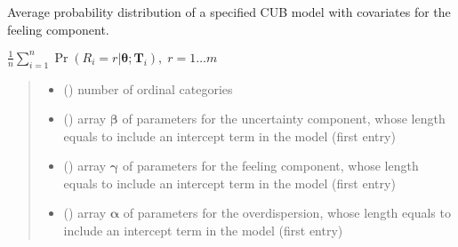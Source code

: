 \documentclass[letterpaper,10pt,english]{sphinxmanual}
\begin{document}
\begin{fulllineitems}
\label{\detokenize{cubmods:cubmods.cube_ywz.pmf}}
\pysigstartsignatures
{}
\pysigstopsignatures
\sphinxAtStartPar
Average probability distribution of a specified CUB model 
with covariates for the feeling component.

\sphinxAtStartPar
\(\frac{1}{n} \sum_{i=1}^n \Pr(R_i=r|\pmb\theta; \pmb T_i),\; r=1 \ldots m\)
\begin{quote}\begin{description}
\begin{itemize}
\item {} 
\sphinxAtStartPar
{} () \textendash{} number of ordinal categories

\item {} 
\sphinxAtStartPar
{} () \textendash{} array \(\pmb \beta\) of parameters for the uncertainty component, whose length equals 
 to include an intercept term in the model (first entry)

\item {} 
\sphinxAtStartPar
{} () \textendash{} array \(\pmb \gamma\) of parameters for the feeling component, whose length equals 
 to include an intercept term in the model (first entry)

\item {} 
\sphinxAtStartPar
{} () \textendash{} array \(\pmb \alpha\) of parameters for the overdispersion, whose length equals 
 to include an intercept term in the model (first entry)


\end{itemize}
\end{description}
\end{quote}
\end{fulllineitems}
\end{document}
